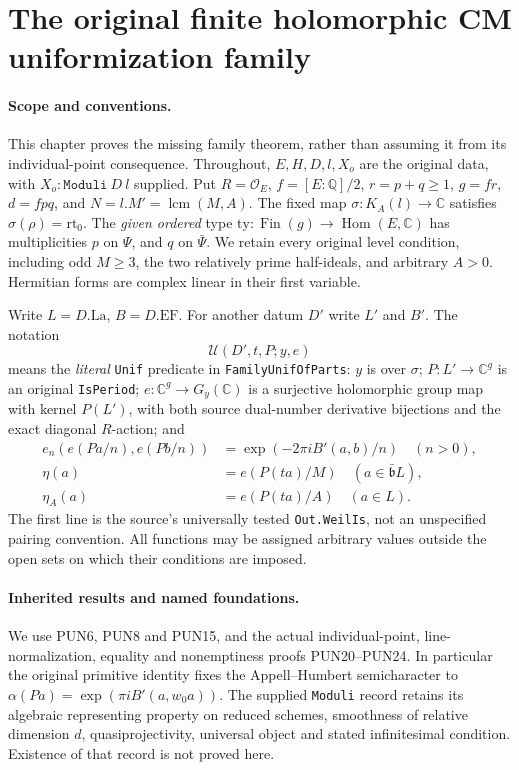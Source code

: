 \section{The original finite holomorphic CM uniformization family}

\paragraph{Scope and conventions.}
This chapter proves the missing family theorem, rather than assuming it
from its individual-point consequence.  Throughout, \(E,H,D,l,X_o\)
are the original data, with \(X_o:\texttt{Moduli}\ D\ l\) supplied.
Put \(R=\mathcal O_E\), \(f=[E:\mathbb Q]/2\), \(r=p+q\geq1\),
\(g=fr\), \(d=fpq\), and \(N=l.M'=\operatorname{lcm}(M,A)\).
The fixed map \(\sigma:K_A(l)\to\mathbb C\) satisfies
\(\sigma(\rho)=\mathrm{rt}_0\).  The \emph{given ordered} type
\(\mathrm{ty}:\operatorname{Fin}(g)\to\operatorname{Hom}(E,\mathbb C)\)
has multiplicities \(p\) on \(\Psi\), and \(q\) on \(\bar\Psi\).
We retain every original level condition, including odd \(M\geq3\),
the two relatively prime half-ideals, and arbitrary \(A>0\).
Hermitian forms are complex linear in their first variable.

Write \(L=D.\mathrm{La}\), \(B=D.\mathrm{EF}\).
For another datum \(D'\) write \(L'\) and \(B'\).
The notation
\[
 \mathcal U(D',t,P;y,e)
 \tag{HUF.1}
\]
means the \emph{literal} \texttt{Unif} predicate in
\texttt{FamilyUnifOfParts}: \(y\) is over \(\sigma\);
\(P:L'\to\mathbb C^g\) is an original \texttt{IsPeriod};
\(e:\mathbb C^g\to G_y(\mathbb C)\) is a surjective holomorphic
group map with kernel \(P(L')\), with both source dual-number
derivative bijections and the exact diagonal \(R\)-action; and
\[
 \begin{split}
 e_n(e(Pa/n),e(Pb/n))&=\exp(-2\pi i B'(a,b)/n)\quad(n>0),\\
 \eta(a)&=e(P(ta)/M)\quad(a\in\bar{\mathfrak b}L),\\
 \eta_A(a)&=e(P(ta)/A)\quad(a\in L).
 \end{split}                                                     \tag{HUF.2}
\]
The first line is the source's universally tested
\texttt{Out.WeilIs}, not an unspecified pairing convention.
All functions may be assigned arbitrary values outside the open sets
on which their conditions are imposed.

\paragraph{Inherited results and named foundations.}
We use PUN6, PUN8 and PUN15, and the actual individual-point,
line-normalization, equality and nonemptiness proofs PUN20--PUN24.
In particular the original primitive identity fixes the
Appell--Humbert semicharacter to
\(\alpha(Pa)=\exp(\pi i B'(a,w_0a))\).
The supplied \texttt{Moduli} record retains its algebraic representing
property on reduced schemes, smoothness of relative dimension \(d\),
quasiprojectivity, universal object and stated infinitesimal condition.
Existence of that record is not proved here.

